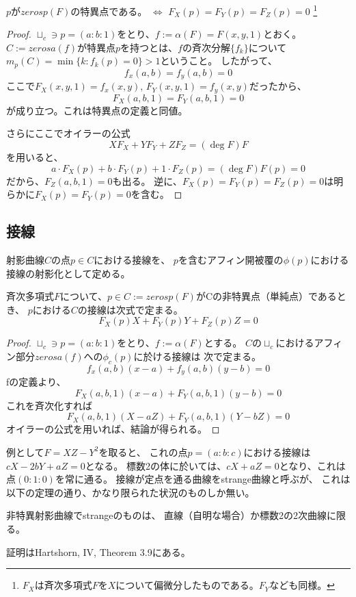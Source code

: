 \documentclass[a4paper]{jsarticle}
\begin{document}
    \begin{Lemma}
        $p$が$zerosp(F)$の特異点である。
        $\iff$ $F_X(p)=F_Y(p)=F_Z(p)=0$
        \footnote{$F_X$は斉次多項式$F$を$X$について偏微分したものである。$F_Y$なども同様。}
    \end{Lemma}
    \begin{proof}
        $\sqcup_c \ni p=(a:b:1)$をとり、$f:=\alpha(F)=F(x, y, 1)$とおく。
        $C:=zerosa(f)$が特異点$p$を持つとは、$f$の斉次分解$\{ f_k \}$について
        $m_p(C)=\min\{k : f_k(p)=0\}>1$ということ。
        したがって、
        \[ f_x(a,b)=f_y(a,b)=0 \]
        ここで$F_X(x, y, 1)=f_x(x,y)$, $F_Y(x, y, 1)=f_y(x,y)$だったから、
        \[ F_X(a, b, 1)=F_Y(a, b, 1)=0 \]
        が成り立つ。これは特異点の定義と同値。

        さらにここでオイラーの公式\[ XF_X+YF_Y+ZF_Z=(\deg F)F \]を用いると、
        \[ a \cdot F_X(p)+b \cdot F_Y(p)+1 \cdot F_Z(p)=(\deg F)F(p)=0 \]
        だから、$F_Z(a, b, 1)=0$も出る。
        逆に、$F_X(p)=F_Y(p)=F_Z(p)=0$は明らかに$F_X(p)=F_Y(p)=0$を含む。
        
    \end{proof}

    \subsection{接線}
    \begin{Def}[射影曲線の接線]
        射影曲線$C$の点$p \in C$における接線を、
        $p$を含むアフィン開被覆の$\phi(p)$における接線の射影化として定める。
    \end{Def}

    \begin{Lemma}
        斉次多項式$F$について、$p \in C:=zerosp(F)$がCの非特異点（単純点）であるとき、
        $p$における$C$の接線は次式で定まる。
        \[ F_X(p)X+F_Y(p)Y+F_Z(p)Z=0 \]
    \end{Lemma}
    \begin{proof}
        $\sqcup_c \ni p=(a:b:1)$をとり、$f:=\alpha(F)$とする。
        $C$の$\sqcup_c$におけるアフィン部分$zerosa(f)$への$\phi_c(p)$に於ける接線は
        次で定まる。
        \[ f_x(a,b)(x-a)+f_y(a,b)(y-b)=0 \]
        fの定義より、
        \[ F_X(a,b,1)(x-a)+F_Y(a,b,1)(y-b)=0 \]
        これを斉次化すれば
        \[ F_X(a,b,1)(X-aZ)+F_Y(a,b,1)(Y-bZ)=0 \]
        オイラーの公式を用いれば、結論が得られる。
    \end{proof}

    例として$F=XZ-Y^2$を取ると、
    これの点$p=(a:b:c)$における接線は$cX-2bY+aZ=0$となる。
    標数2の体に於いては、$cX+aZ=0$となり、これは点$(0:1:0)$を常に通る。
    接線が定点を通る曲線をstrange曲線と呼ぶが、
    これは以下の定理の通り、かなり限られた状況のものしか無い。
    \begin{Them}[Samuel]
        非特異射影曲線でstrangeのものは、
        直線（自明な場合）か標数2の2次曲線に限る。
    \end{Them}
    証明はHartshorn, IV, Theorem 3.9にある。
\end{document}
